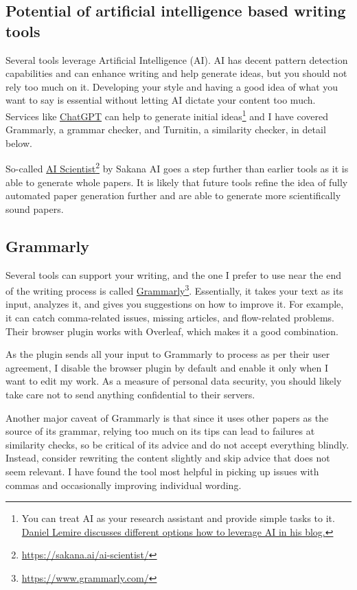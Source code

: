 \subsection{Potential of artificial intelligence based writing tools}

Several tools leverage Artificial Intelligence (AI).
AI has decent pattern detection capabilities and can enhance writing and help generate ideas, but you should not rely too much on it.
Developing your style and having a good idea of what you want to say is essential without letting AI dictate your content too much. Services like \href{https://chatgpt.com/}{ChatGPT} can help to generate initial ideas\footnote{You can treat AI as your research assistant and provide simple tasks to it. \href{https://lemire.me/blog/2024/04/27/large-language-models-e-g-chatgpt-as-research-assistants/}{Daniel Lemire discusses different options how to leverage AI in his blog.}} and I have covered Grammarly, a grammar checker, and Turnitin, a similarity checker, in detail below.

So-called \href{https://sakana.ai/ai-scientist/}{AI Scientist}\footnote{\url{https://sakana.ai/ai-scientist/}} by Sakana AI goes a step further than earlier tools as it is able to generate whole papers.
It is likely that future tools refine the idea of fully automated paper generation further and are able to generate more scientifically sound papers.

\subsection{Grammarly}

Several tools can support your writing, and the one I prefer to use near the end of the writing process is called \href{https://www.grammarly.com/}{Grammarly}\footnote{\url{https://www.grammarly.com/}}.
Essentially, it takes your text as its input, analyzes it, and gives you suggestions on how to improve it.
For example, it can catch comma-related issues, missing articles, and flow-related problems.
Their browser plugin works with Overleaf, which makes it a good combination.

As the plugin sends all your input to Grammarly to process as per their user agreement, I disable the browser plugin by default and enable it only when I want to edit my work.
As a measure of personal data security, you should likely take care not to send anything confidential to their servers.

Another major caveat of Grammarly is that since it uses other papers as the source of its grammar, relying too much on its tips can lead to failures at similarity checks, so be critical of its advice and do not accept everything blindly.
Instead, consider rewriting the content slightly and skip advice that does not seem relevant.
I have found the tool most helpful in picking up issues with commas and occasionally improving individual wording.

